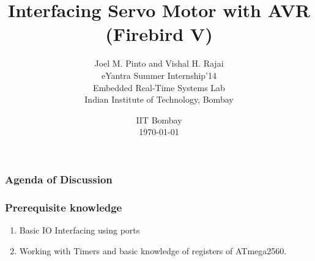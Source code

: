 \documentclass[table,10pt,red]{beamer}	%
\title
[
	Servo Interfacing with AVR	%
	\hspace{0.5cm}
	\insertframenumber/\inserttotalframenumber
]
{
	Interfacing Servo Motor with AVR (Firebird V)
}
\author
[
	Vishal and Joel 	%
]
{
  Joel M. Pinto and Vishal H. Rajai\\
  eYantra Summer Internship'14\\
  Embedded Real-Time Systems Lab\\
  Indian Institute of Technology, Bombay\\
}
\date
{
IIT Bombay \\ {\today}	%
}
\begin{document}
\begin{frame}
	\titlepage
\end{frame}

\begin{frame}
	\frametitle{Agenda of Discussion}


	\tableofcontents
\end{frame}

\begin{frame}
	\frametitle{Prerequisite knowledge}
	\begin{enumerate}
		\item Basic IO Interfacing using ports
		\item Working with Timers and basic knowledge of registers of ATmega2560.


	\end{enumerate}
\end{frame}
\end{document}
